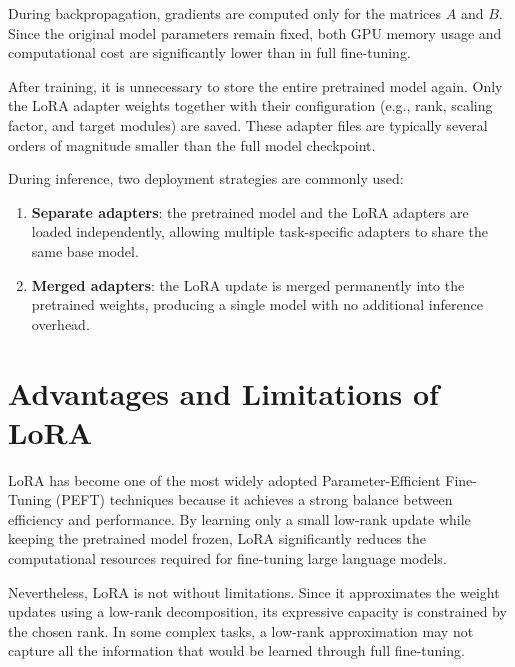 During backpropagation, gradients are computed only for the matrices \(A\) and \(B\). Since the original model parameters remain fixed, both GPU memory usage and computational cost are significantly lower than in full fine-tuning.

After training, it is unnecessary to store the entire pretrained model again. Only the LoRA adapter weights together with their configuration (e.g., rank, scaling factor, and target modules) are saved. These adapter files are typically several orders of magnitude smaller than the full model checkpoint.

During inference, two deployment strategies are commonly used:

\begin{enumerate}
    \item \textbf{Separate adapters}: the pretrained model and the LoRA adapters are loaded independently, allowing multiple task-specific adapters to share the same base model.
    \item \textbf{Merged adapters}: the LoRA update is merged permanently into the pretrained weights, producing a single model with no additional inference overhead.
\end{enumerate}
\section{Advantages and Limitations of LoRA}

LoRA has become one of the most widely adopted Parameter-Efficient Fine-Tuning (PEFT) techniques because it achieves a strong balance between efficiency and performance. By learning only a small low-rank update while keeping the pretrained model frozen, LoRA significantly reduces the computational resources required for fine-tuning large language models.

Nevertheless, LoRA is not without limitations. Since it approximates the weight updates using a low-rank decomposition, its expressive capacity is constrained by the chosen rank. In some complex tasks, a low-rank approximation may not capture all the information that would be learned through full fine-tuning.

